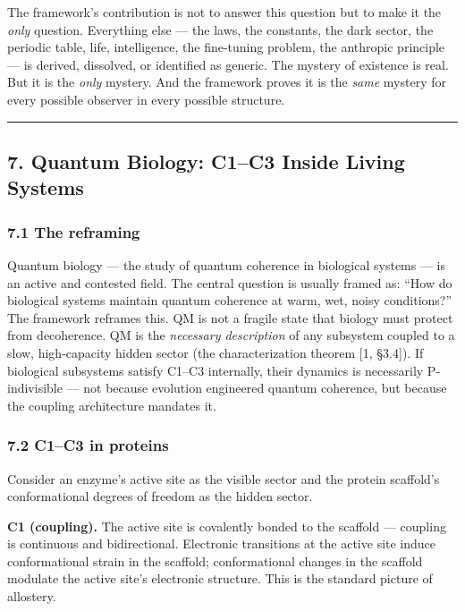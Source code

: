\documentclass[
]{article}
\begin{document}
The framework's contribution is not to answer this question but to make
it the \emph{only} question. Everything else --- the laws, the
constants, the dark sector, the periodic table, life, intelligence, the
fine-tuning problem, the anthropic principle --- is derived, dissolved,
or identified as generic. The mystery of existence is real. But it is
the \emph{only} mystery. And the framework proves it is the \emph{same}
mystery for every possible observer in every possible structure.

\begin{center}\rule{0.5\linewidth}{0.5pt}\end{center}

\hypertarget{quantum-biology-c1c3-inside-living-systems}{%
\subsection{7. Quantum Biology: C1--C3 Inside Living
Systems}\label{quantum-biology-c1c3-inside-living-systems}}

\hypertarget{the-reframing}{%
\subsubsection{7.1 The reframing}\label{the-reframing}}

Quantum biology --- the study of quantum coherence in biological systems
--- is an active and contested field. The central question is usually
framed as: ``How do biological systems maintain quantum coherence at
warm, wet, noisy conditions?'' The framework reframes this. QM is not a
fragile state that biology must protect from decoherence. QM is the
\emph{necessary description} of any subsystem coupled to a slow,
high-capacity hidden sector (the characterization theorem {[}1,
§3.4{]}). If biological subsystems satisfy C1--C3 internally, their
dynamics is necessarily P-indivisible --- not because evolution
engineered quantum coherence, but because the coupling architecture
mandates it.

\hypertarget{c1c3-in-proteins}{%
\subsubsection{7.2 C1--C3 in proteins}\label{c1c3-in-proteins}}

Consider an enzyme's active site as the visible sector and the protein
scaffold's conformational degrees of freedom as the hidden sector.

\textbf{C1 (coupling).} The active site is covalently bonded to the
scaffold --- coupling is continuous and bidirectional. Electronic
transitions at the active site induce conformational strain in the
scaffold; conformational changes in the scaffold modulate the active
site's electronic structure. This is the standard picture of allostery.
\end{document}
